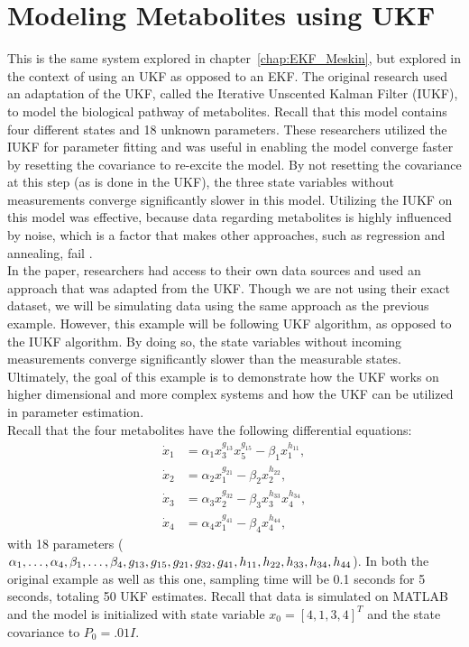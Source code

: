 \section{Modeling Metabolites using UKF}
\label{Modeling Metabolites using UKF}




\noindent This is the same system explored in chapter~\ref{chap:EKF_Meskin}, but explored in the context of using an UKF as opposed to an EKF. The original research used an adaptation of the UKF, called the Iterative Unscented Kalman Filter (IUKF), to model the biological pathway of metabolites. Recall that this model contains four different states and 18 unknown parameters. These researchers utilized the IUKF for parameter fitting and was useful in enabling the model converge faster by resetting the covariance to re-excite the model. By not resetting the covariance at this step (as is done in the UKF), the three state variables without measurements converge significantly slower in this model. Utilizing the IUKF on this model was effective, because data regarding metabolites is highly influenced by noise, which is a factor that makes other approaches, such as regression and annealing, fail \cite{article5}. \\ 

\noindent In the paper, researchers had access to their own data sources and used an approach that was adapted from the UKF. Though we are not using their exact dataset, we will be simulating data using the same approach as the previous example. However, this example will be following UKF algorithm, as opposed to the IUKF algorithm. By doing so, the state variables without incoming measurements converge significantly slower than the measurable states. Ultimately, the goal of this example is to demonstrate how the UKF works on higher dimensional and more complex systems and how the UKF can be utilized in parameter estimation. \\

\noindent Recall that the four metabolites have the following differential equations:
\begin{align*}
\dot x_1 &= \alpha_1 x_3^{g_{13}} x_5^{g_{15}} - \beta_1 x_1^{h_{11}}, \\
\dot x_2 &= \alpha_2 x_1^{g_{21}} - \beta_2 x_2^{h_{22}}, \\
\dot x_3 &= \alpha_3 x_2^{g_{32}} - \beta_3 x_3^{h_{33}} x_4^{h_{34}}, \\
\dot x_4 &= \alpha_4  x_1^{g_{41}} - \beta_4 x_4^{h_{44}},
\end{align*}
with 18 parameters ($\alpha_1, \hdots, \alpha_4, \beta_1, \hdots, \beta_4, g_{13}, g_{15}, g_{21}, g_{32}, g_{41}, h_{11}, h_{22}, h_{33}, h_{34},\\ h_{44} $). In both the original example as well as this one, sampling time will be 0.1 seconds for 5 seconds, totaling 50 UKF estimates. Recall that data is simulated on MATLAB and the model is initialized with state variable $x_0 = [4, 1, 3, 4]^T$ and the state covariance to $P_0 = .01I$. \\

